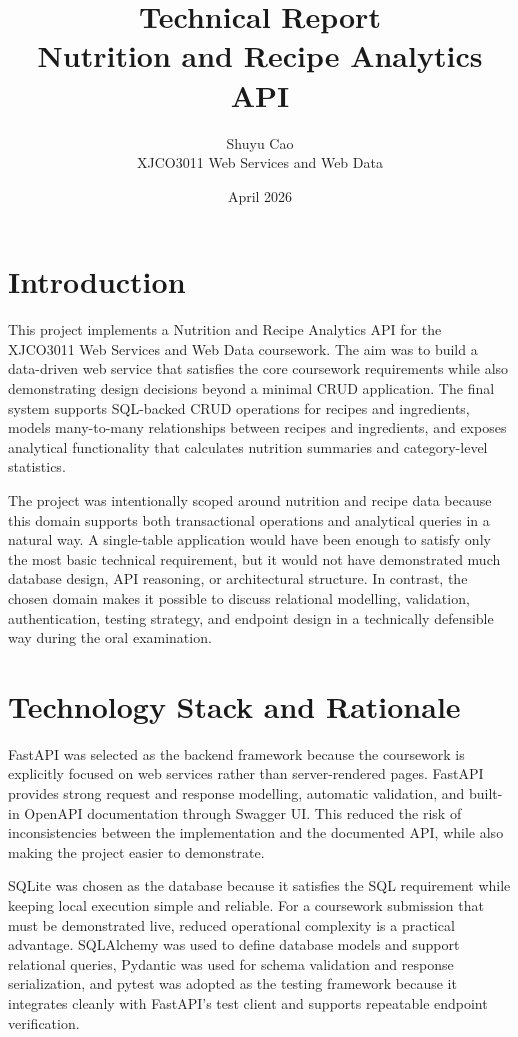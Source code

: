 \documentclass[11pt,a4paper]{article}
\title{\textbf{Technical Report}\\Nutrition and Recipe Analytics API}
\author{Shuyu Cao\\XJCO3011 Web Services and Web Data}
\date{April 2026}
\begin{document}
\maketitle
\onehalfspacing

\section{Introduction}
This project implements a Nutrition and Recipe Analytics API for the XJCO3011 Web Services and Web Data coursework. The aim was to build a data-driven web service that satisfies the core coursework requirements while also demonstrating design decisions beyond a minimal CRUD application. The final system supports SQL-backed CRUD operations for recipes and ingredients, models many-to-many relationships between recipes and ingredients, and exposes analytical functionality that calculates nutrition summaries and category-level statistics.

The project was intentionally scoped around nutrition and recipe data because this domain supports both transactional operations and analytical queries in a natural way. A single-table application would have been enough to satisfy only the most basic technical requirement, but it would not have demonstrated much database design, API reasoning, or architectural structure. In contrast, the chosen domain makes it possible to discuss relational modelling, validation, authentication, testing strategy, and endpoint design in a technically defensible way during the oral examination.

\section{Technology Stack and Rationale}
FastAPI was selected as the backend framework because the coursework is explicitly focused on web services rather than server-rendered pages. FastAPI provides strong request and response modelling, automatic validation, and built-in OpenAPI documentation through Swagger UI. This reduced the risk of inconsistencies between the implementation and the documented API, while also making the project easier to demonstrate.

SQLite was chosen as the database because it satisfies the SQL requirement while keeping local execution simple and reliable. For a coursework submission that must be demonstrated live, reduced operational complexity is a practical advantage. SQLAlchemy was used to define database models and support relational queries, Pydantic was used for schema validation and response serialization, and pytest was adopted as the testing framework because it integrates cleanly with FastAPI's test client and supports repeatable endpoint verification.
\end{document}

